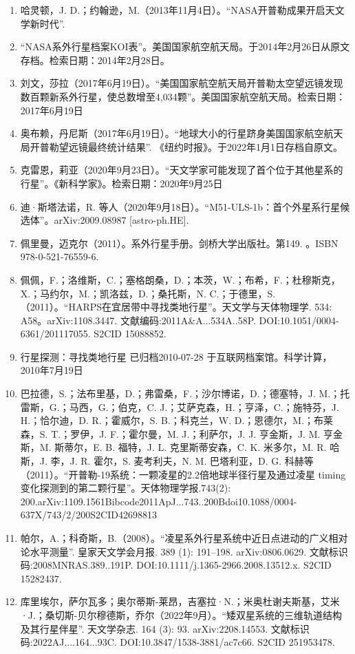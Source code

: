 \begin{enumerate}
\item  哈灵顿，J. D.；约翰逊，M.（2013年11月4日）。“NASA开普勒成果开启天文学新时代”.
\item “NASA系外行星档案KOI表”。美国国家航空航天局。于2014年2月26日从原文存档。检索日期：2014年2月28日。
\item 刘文，莎拉（2017年6月19日）。“美国国家航空航天局开普勒太空望远镜发现数百颗新系外行星，使总数增至4,034颗”。美国国家航空航天局。检索日期：2017年6月19日
\item 奥布赖，丹尼斯（2017年6月19日）。“地球大小的行星跻身美国国家航空航天局开普勒望远镜最终统计结果”. 《纽约时报》。于2022年1月1日存档自原文。
\item 克雷恩，莉亚（2020年9月23日）。“天文学家可能发现了首个位于其他星系的行星”。《新科学家》。检索日期：2020年9月25日
\item 迪·斯塔法诺，R. 等人（2020年9月18日）。“M51-ULS-1b：首个外星系行星候选体”。arXiv:2009.08987 [astro-ph.HE].
\item 佩里曼，迈克尔（2011）。系外行星手册。剑桥大学出版社。第149. 。ISBN 978-0-521-76559-6.
\item 佩佩，F.；洛维斯，C.；塞格朗桑，D.；本茨，W.；布希，F.；杜穆斯克，X.；马约尔，M.；凯洛兹，D.；桑托斯，N. C.；于德里，S.（2011）。“HARPS在宜居带中寻找类地行星”。天文学与天体物理学. 534: A58。arXiv:1108.3447. 文献编码:2011A&A...534A..58P. DOI:10.1051/0004-6361/201117055. S2CID 15088852.
\item 行星探测：寻找类地行星 已归档2010-07-28 于互联网档案馆。科学计算，2010年7月19日
\item 巴拉德，S.；法布里基，D.；弗雷桑，F.；沙尔博诺，D.；德塞特，J. M.；托雷斯，G.；马西，G.；伯克，C. J.；艾萨克森，H.；亨泽，C.；施特芬，J. H.；恰尔迪，D. R.；霍威尔，S. B.；科克兰，W. D.；恩德尔，M.；布莱森，S. T.；罗伊，J. F.；霍尔曼，M. J.；利萨尔，J. J. 亨金斯，J. M. 亨金斯，M. 斯蒂尔，E. B. 福特，J. L. 克里斯蒂安森，C. K. 米多尔，M. R. 哈斯，J. 李，J. R. 霍尔，S. 麦考利夫，N. M. 巴塔利亚，D. G. 科赫等（2011）。“开普勒-19系统：一颗凌星的2.2倍地球半径行星及通过凌星 timing 变化探测到的第二颗行星”。天体物理学报.743(2): 200.arXiv:1109.1561Bibcode2011ApJ...743..200Bdoi10.1088/0004-637X/743/2/200S2CID42698813
\item 帕尔，A.；科奇斯，B.（2008）。“凌星系外行星系统中近日点进动的广义相对论水平测量”. 皇家天文学会月报. 389 (1): 191–198. arXiv:0806.0629. 文献标识码:2008MNRAS.389..191P. DOI:10.1111/j.1365-2966.2008.13512.x. S2CID 15282437.
\item 库里埃尔，萨尔瓦多；奥尔蒂斯-莱昂，吉塞拉·N.；米奥杜谢夫斯基，艾米·J.；桑切斯-贝尔穆德斯，乔尔（2022年9月）。“矮双星系统的三维轨道结构及其行星伴星”. 天文学杂志. 164 (3): 93. arXiv:2208.14553. 文献标识码:2022AJ....164...93C. DOI:10.3847/1538-3881/ac7c66. S2CID 251953478.

\end{enumerate}

